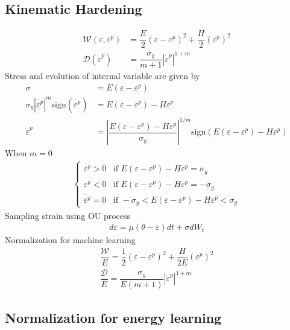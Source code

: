 \documentclass[11pt]{article}
\begin{document}
\subsection{Kinematic Hardening}
\label{a:sec:kinematic-hardening}
\begin{align}
\mathcal{W}(\varepsilon, \varepsilon^p) &= \dfrac{E}{2}(\varepsilon - \varepsilon^p)^2 + \dfrac{H}{2}(\varepsilon^p)^2\\
\mathcal{D}(\dot{\varepsilon}^p) &= \dfrac{\sigma_y}{m+1}|\dot{\varepsilon}^p|^{1+m}
\end{align}
Stress and evolution of internal variable are given by 
\begin{align}
    \sigma &= E(\varepsilon - \varepsilon^p)\\
    \sigma_y|\dot{\varepsilon^p}|^m \mathrm{sign}(\dot{\varepsilon^p}) &= E(\varepsilon - \varepsilon^p) - H \varepsilon^p\\
    \dot{\varepsilon}^p &=\left|\dfrac{E(\varepsilon - \varepsilon^p) - H\varepsilon^p}{\sigma_y}\right|^{1/m} \mathrm{sign}(E(\varepsilon - \varepsilon^p) - H\varepsilon^p)
\end{align}
When $m=0$
\begin{align}
    \begin{cases}
        \dot{\varepsilon^p} > 0 & \text{if } E(\varepsilon - \varepsilon^p) - H \varepsilon^p = \sigma_y\\
        \dot{\varepsilon^p} < 0 & \text{if } E(\varepsilon - \varepsilon^p) - H \varepsilon^p = -\sigma_y\\
        \dot{\varepsilon^p} = 0 & \text{if } -\sigma_y < E(\varepsilon - \varepsilon^p) - H \varepsilon^p < \sigma_y
    \end{cases}
\end{align}
Sampling strain using OU process 
\begin{align}
    d\varepsilon = \mu(\theta - \varepsilon)dt + \sigma dW_t
\end{align}
Normalization for machine learning
\begin{align}
  \dfrac{\mathcal{W}}{E} = \dfrac{1}{2} (\varepsilon - \varepsilon^p)^2 + \dfrac{H}{2E}(\varepsilon^p)^2\\
  \dfrac{\mathcal{D}}{E} = \dfrac{\sigma_y}{E(m+1)}|\dot{\varepsilon}^p|^{1+m}
\end{align}
\subsection{Normalization for energy learning}
\end{document}
